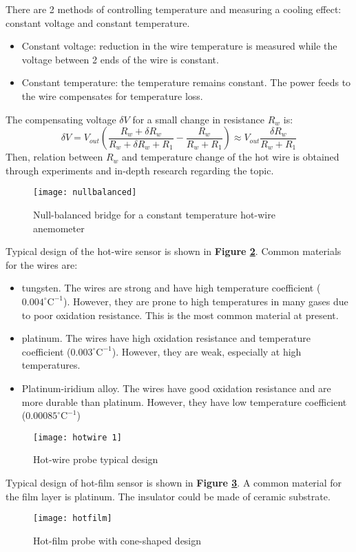 There are 2 methods of controlling temperature and measuring a cooling effect: constant voltage and constant temperature.
\begin{itemize}
	\item Constant voltage: reduction in the wire temperature is measured while the voltage between 2 ends of the wire is constant.
	\item Constant temperature: the temperature remains constant. The power feeds to the wire compensates for temperature loss.
\end{itemize}
The compensating voltage $ \delta V $ for a small change in resistance $ R_w $ is:
\[
\delta V = V_{out}\left(\dfrac{R_w+\delta R_w}{R_w+\delta R_w +R_1} - \dfrac{R_w}{R_w + R_1}\right) \approx V_{out} \dfrac{\delta R_w}{R_w + R_1}
\]
Then, relation between $ R_w $ and temperature change of the hot wire is obtained through experiments and in-depth research regarding the topic.
\begin{figure}[ht]
	\centering
	\texttt{[image: nullbalanced]}
	\caption{Null-balanced bridge for a constant temperature hot-wire anemometer \cite{handbook}}
	\label{nullb}
\end{figure}
Typical design of the hot-wire sensor is shown in \textbf{Figure \ref{hotwire}}. Common materials for the wires are:
\begin{itemize}
	\item tungsten. The wires are strong and have high temperature coefficient ($ 0.004^\circ\text{C}^{-1} $). However, they are prone to high temperatures in many gases due to poor oxidation resistance. This is the most common material at present.
	\item platinum. The wires have high oxidation resistance and temperature coefficient ($ 0.003^\circ\text{C}^{-1} $). However, they are weak, especially at high temperatures.
	\item Platinum-iridium alloy. The wires have good oxidation resistance and are more durable than platinum. However, they have low temperature coefficient ($ 0.00085^\circ\text{C}^{-1} $)
\end{itemize}
\begin{figure}[ht]
	\centering
	\texttt{[image: hotwire 1]}
	\caption{Hot-wire probe typical design \cite{handbook}}
	\label{hotwire}
\end{figure}

Typical design of hot-film sensor is shown in \textbf{Figure \ref{hotfilm}}. A common material for the film layer is platinum. The insulator could be made of ceramic substrate.
\begin{figure}[ht]
	\centering
	\texttt{[image: hotfilm]}
	\caption{Hot-film probe with cone-shaped design \cite{handbook}}
	\label{hotfilm}
\end{figure}


